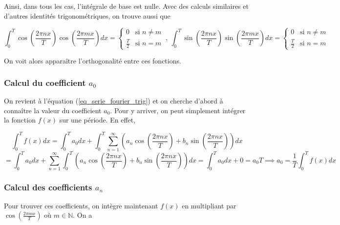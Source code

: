 Ainsi, dans tous les cas, l'intégrale de base est nulle. Avec des calculs similaires et d'autres identités trigonométriques, on trouve aussi que 

\begin{equation*}
    \int_{0}^{T}\cos(\frac{2\pi nx}{T})\cos(\frac{2\pi mx}{T})dx = \begin{cases}
        0 & \text{si $n \neq m$}\\
        \frac{T}{2} & \text{si $n = m$}
      \end{cases}\ , \ \int_{0}^{T}\sin(\frac{2\pi nx}{T})\sin(\frac{2\pi mx}{T})dx = \begin{cases}
        0 & \text{si $n \neq m$}\\
        \frac{T}{2} & \text{si $n = m$}
      \end{cases}     
\end{equation*}

On voit alors apparaître l'orthogonalité entre ces fonctions.

\subsubsection{Calcul du coefficient $a_0$}
On revient à l'équation (\ref{eq_serie_fourier_trig}) et on cherche d'abord à connaître la valeur du coefficient $a_0$. Pour y arriver, on peut simplement intégrer la fonction $f(x)$ sur une période. En effet,

\begin{equation*}
    \int_{0}^{T}f(x)dx = \int_{0}^{T}a_0 dx + \int_{0}^{T}\sum_{n=1}^{\infty}\left(a_n\cos(\frac{2\pi n x}{T}) + b_n\sin(\frac{2\pi n x}{T})\right)dx
\end{equation*}
\begin{equation*}
    = \int_{0}^{T}a_0 dx + \sum_{n=1}^{\infty}\int_{0}^{T}\left(a_n\cos(\frac{2\pi n x}{T}) + b_n\sin(\frac{2\pi n x}{T})\right)dx = \int_{0}^{T}a_0 dx + 0 = a_0T \implies a_0 = \frac{1}{T}\int_{0}^{T}f(x)dx
\end{equation*}

\subsubsection{Calcul des coefficients $a_n$}
Pour trouver ces coefficients, on intègre maintenant $f(x)$ en multipliant par $\cos(\frac{2\pi mx}{T})$ où $m \in  \mathbb{N}$. On a

